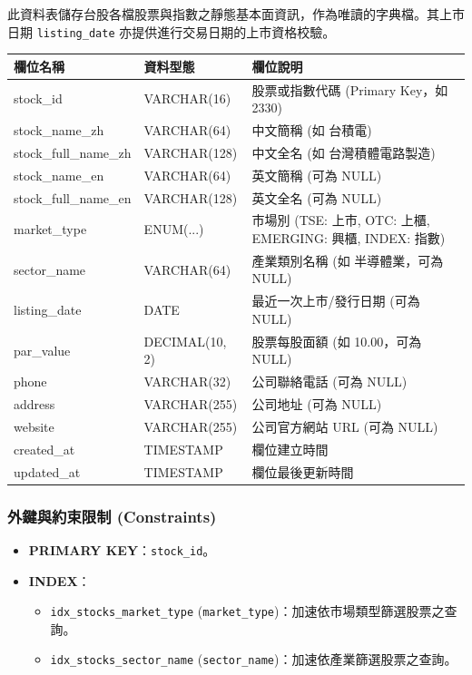 \documentclass[UTF8, a4paper, 12pt, fontset=none]{ctexart}
\begin{document}
    此資料表儲存台股各檔股票與指數之靜態基本面資訊，作為唯讀的字典檔。其上市日期 \texttt{listing\_date} 亦提供進行交易日期的上市資格校驗。
    \vspace{-0.5cm}
    \begin{center}
    \begin{tabular}{|l|l|p{8cm}|}
    \hline
    \textbf{欄位名稱} & \textbf{資料型態} & \textbf{欄位說明} \\ \hline
    stock\_id & VARCHAR(16) & 股票或指數代碼 (Primary Key，如 2330) \\ \hline
    stock\_name\_zh & VARCHAR(64) & 中文簡稱 (如 台積電) \\ \hline
    stock\_full\_name\_zh & VARCHAR(128) & 中文全名 (如 台灣積體電路製造) \\ \hline
    stock\_name\_en & VARCHAR(64) & 英文簡稱 (可為 NULL) \\ \hline
    stock\_full\_name\_en & VARCHAR(128) & 英文全名 (可為 NULL) \\ \hline
    market\_type & ENUM(...) & 市場別 (TSE: 上市, OTC: 上櫃, EMERGING: 興櫃, INDEX: 指數) \\ \hline
    sector\_name & VARCHAR(64) & 產業類別名稱 (如 半導體業，可為 NULL) \\ \hline
    listing\_date & DATE & 最近一次上市/發行日期 (可為 NULL) \\ \hline
    par\_value & DECIMAL(10, 2) & 股票每股面額 (如 10.00，可為 NULL) \\ \hline
    phone & VARCHAR(32) & 公司聯絡電話 (可為 NULL) \\ \hline
    address & VARCHAR(255) & 公司地址 (可為 NULL) \\ \hline
    website & VARCHAR(255) & 公司官方網站 URL (可為 NULL) \\ \hline
    created\_at & TIMESTAMP & 欄位建立時間 \\ \hline
    updated\_at & TIMESTAMP & 欄位最後更新時間 \\ \hline
    \end{tabular}
    \end{center}

    \subsubsection*{外鍵與約束限制 (Constraints)}
    \begin{itemize}
        \item \textbf{PRIMARY KEY}：\texttt{stock\_id}。
        \item \textbf{INDEX}：
            \begin{itemize}
                \item \texttt{idx\_stocks\_market\_type} (\texttt{market\_type})：加速依市場類型篩選股票之查詢。
                \item \texttt{idx\_stocks\_sector\_name} (\texttt{sector\_name})：加速依產業篩選股票之查詢。
            \end{itemize}
    \end{itemize}
\end{document}
